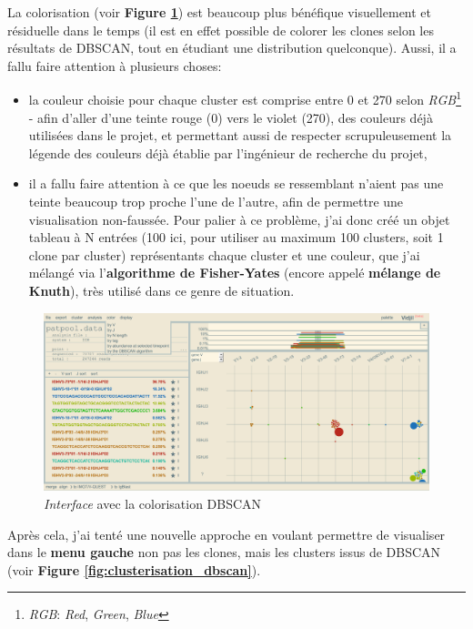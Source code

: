 \documentclass[pdftex,12pt,a4paper]{report}
\begin{document}
\begin{spacing}{1.2}
La colorisation (voir \textbf{Figure \ref{fig:colorisation_dbscan}}) est beaucoup plus bénéfique visuellement et résiduelle dans le temps (il est en effet possible de colorer les clones selon les résultats de DBSCAN, tout en étudiant une distribution quelconque).
\newline
Aussi, il a fallu faire attention à plusieurs choses:
	\begin{itemize}
		\item{la couleur choisie pour chaque cluster est comprise entre 0 et 270 selon \textit{RGB}\footnote{\textit{RGB}: \textit{Red}, \textit{Green}, \textit{Blue}} - afin d'aller d'une teinte rouge (0) vers le violet (270), des couleurs déjà utilisées dans le projet, et permettant aussi de respecter scrupuleusement la légende des couleurs déjà établie par l'ingénieur de recherche du projet,}
		\item{il a fallu faire attention à ce que les noeuds se ressemblant n'aient pas une teinte beaucoup trop proche l'une de l'autre, afin de permettre une visualisation non-faussée.
			\newline
			Pour palier à ce problème, j'ai donc créé un objet tableau à N entrées (100 ici, pour utiliser au maximum 100 clusters, soit 1 clone par cluster) représentants chaque cluster et une couleur, que j'ai mélangé via l'\textbf{algorithme de Fisher-Yates} (encore appelé \textbf{mélange de Knuth}), très utilisé dans ce genre de situation.}
	\end{itemize}

\begin{figure}[H]
\begin{center}
	\includegraphics[scale=0.35]{img/DBSCAN-Color-Ex.jpg}
\end{center}
\caption{\textit{Interface} avec la colorisation DBSCAN}
\label{fig:colorisation_dbscan}
\end{figure}

Après cela, j'ai tenté une nouvelle approche en voulant permettre de visualiser dans le \textbf{menu gauche} non pas les clones, mais les clusters issus de DBSCAN (voir \textbf{Figure \ref{fig:clusterisation_dbscan}}).


\end{spacing}
\end{document}

